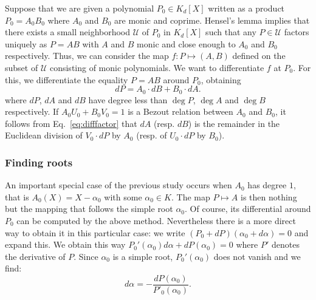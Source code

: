 \documentclass{lms}
\begin{document}
Suppose that we are given a polynomial $P_0 \in K_d[X]$ written as a 
product $P_0 = A_0 B_0$ where $A_0$ and $B_0$ are monic and coprime. 
Hensel's lemma implies that there exists a small neighborhood $\mathcal 
U$ of $P_0$ in $K_d[X]$ such that any $P \in \mathcal U$ factors 
uniquely as $P = A B$ with $A$ and $B$ monic and close enough to $A_0$ 
and $B_0$ respectively. Thus, we can consider the map $f : P 
\mapsto (A,B)$ defined on the subset of $\mathcal U$ consisting of monic 
polynomials. We want to differentiate $f$ at $P_0$. For this, we 
differentiate the equality $P = A B$ around $P_0$, obtaining
\begin{equation}
\label{eq:difffactor}
dP = A_0 \cdot dB + B_0 \cdot dA.
\end{equation}
where $dP$, $dA$ and $dB$ have degree less than $\deg P$, $\deg A$ and 
$\deg B$ respectively. If $A_0 U_0 + B_0 V_0 = 1$ is a Bezout relation
between $A_0$ and $B_0$, it follows from Eq.~\eqref{eq:difffactor} that
$dA$ (resp. $dB$) is the remainder in the Euclidean division of $V_0
{\cdot} dP$ by $A_0$ (resp. of $U_0 {\cdot} dP$ by $B_0$).

\subsubsection*{Finding roots}

An important special case of the previous study occurs when $A_0$ has 
degree $1$, that is $A_0(X) = X - \alpha_0$ with some $\alpha_0 \in K$. 
The map $P \mapsto A$ is then nothing but the mapping that 
follows the simple root $\alpha_0$. Of course, its differential around 
$P_0$ can be computed by the above method. Nevertheless there is a more 
direct way to obtain it in this particular case: we write $(P_0 + 
dP)(\alpha_0 + d\alpha) = 0$ and expand this. We obtain this way 
$P_0'(\alpha_0) d\alpha + dP(\alpha_0) = 0$ where $P'$ denotes the 
derivative of $P$. Since $\alpha_0$ is a simple root, $P_0'(\alpha_0)$ 
does not vanish and we find:
$$d \alpha = - \frac{dP(\alpha_0)}{P'_0(\alpha_0)}.$$
\end{document}

